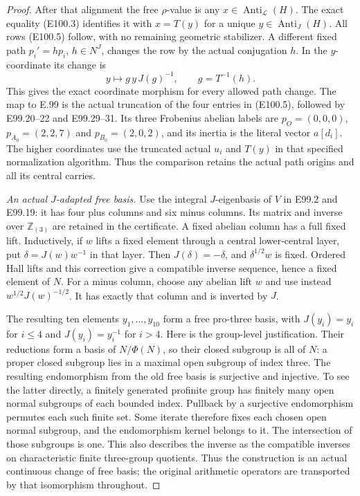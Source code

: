 \begin{proof}
After that alignment the free $\rho$-value
is any $x\in\operatorname{Anti}_{\mathcal L}(H)$.
The exact equality (E100.3) identifies it
with $x=T(y)$ for a unique
$y\in\operatorname{Anti}_J(H)$.
All rows (E100.5) follow, with no remaining
geometric stabilizer. A different fixed path
$p_i'=h p_i$, $h\in N^J$, changes the row
by the actual conjugation $h$. In the
$y$-coordinate its change is
\[
 y\longmapsto g\,y\,J(g)^{-1},\qquad g=T^{-1}(h).
 \tag{E100.18}
\]
This gives the exact coordinate morphism
for every allowed path change.
The map to E.99 is the actual truncation
of the four entries in (E100.5), followed
by E99.20--22 and E99.29--31.
Its three Frobenius abelian labels are
$p_O=(0,0,0)$, $p_{A_0}=(2,2,7)$ and
$p_{B_0}=(2,0,2)$, and its inertia is
the literal vector $a[d_i]$.
The higher coordinates use the truncated
actual $u_i$ and $T(y)$ in that specified
normalization algorithm. Thus the
comparison retains the actual path
origins and all its central carries.

\emph{An actual $J$-adapted free basis.}
Use the integral $J$-eigenbasis of $V$ in
E99.2 and E99.19: it has four plus columns
and six minus columns. Its matrix and
inverse over $\mathbb Z_{(3)}$ are retained
in the certificate. A fixed abelian column
has a full fixed lift. Inductively, if $w$
lifts a fixed element through a central
lower-central layer, put
$\delta=J(w)w^{-1}$ in that layer.
Then $J(\delta)=-\delta$, and
$\delta^{1/2}w$ is fixed. Ordered Hall
lifts and this correction give a compatible
inverse sequence, hence a fixed element
of $N$. For a minus column, choose any
abelian lift $w$ and use instead
$w^{1/2}J(w)^{-1/2}$. It has exactly that
column and is inverted by $J$.

The resulting ten elements $y_1,\ldots,y_{10}$
form a free pro-three basis, with
$J(y_i)=y_i$ for $i\le4$ and
$J(y_i)=y_i^{-1}$ for $i>4$.
Here is the group-level justification.
Their reductions form a basis of $N/\Phi(N)$,
so their closed subgroup is all of $N$:
a proper closed subgroup lies in a maximal
open subgroup of index three. The resulting
endomorphism from the old free basis is
surjective and injective. To see the latter
directly, a finitely generated profinite
group has finitely many open normal
subgroups of each bounded index. Pullback
by a surjective endomorphism permutes each
such finite set. Some iterate therefore
fixes each chosen open normal subgroup,
and the endomorphism kernel belongs to it.
The intersection of those subgroups is one.
This also describes the inverse as the
compatible inverses on characteristic
finite three-group quotients. Thus the
construction is an actual continuous
change of free basis; the original
arithmetic operators are transported by
that isomorphism throughout.


\end{proof}
